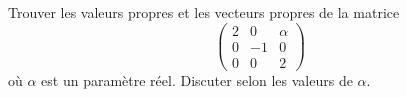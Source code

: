 

\begin{exercice}\label{exoINGE1121La0020}

	Trouver les valeurs propres et les vecteurs propres de la matrice
	\begin{equation}
		\begin{pmatrix}
			2	&	0	&	\alpha	\\
			0	&	-1	&	0	\\
			0	&	0	&	2
		\end{pmatrix}
	\end{equation}
	où $\alpha$ est un paramètre réel. Discuter selon les valeurs de $\alpha$.

\end{exercice}
